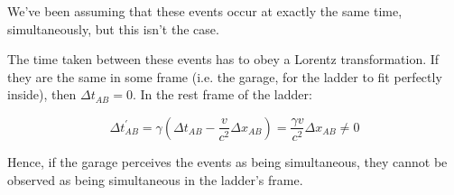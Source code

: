 We've been assuming that these events occur at exactly the same time, simultaneously, but this isn't the case.

The time taken between these events has to obey a Lorentz transformation. If they are the same in some frame (i.e. the garage, for the ladder to fit perfectly inside), then $\Delta t_{AB} = 0$. In the rest frame of the ladder:

$$
\Delta t_{AB}^\prime = \gamma \left(\Delta t_{AB} - \frac{v}{c^2} \Delta x_{AB}\right) = \frac{\gamma v}{c^2} \Delta x_{AB} \not = 0
$$

Hence, if the garage perceives the events as being simultaneous, they cannot be observed as being simultaneous in the ladder's frame.